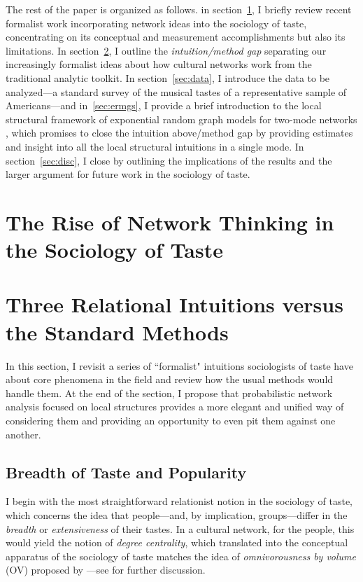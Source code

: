 \documentclass[preprint,12pt,authoryear]{elsarticle}
\begin{document}
The rest of the paper is organized as follows. in section~\ref{sec:networks}, I briefly review recent formalist work incorporating network ideas into the sociology of taste, concentrating on its conceptual and measurement accomplishments but also its limitations. In section~\ref{sec:localstruct}, I outline the \textit{intuition/method gap} separating our increasingly formalist ideas about how cultural networks work from the traditional analytic toolkit. In section~\ref{sec:data}, I introduce the data to be analyzed---a standard survey of the musical tastes of a representative sample of Americans---and in~\ref{sec:ermgs}, I provide a brief introduction to the local structural framework of exponential random graph models for two-mode networks \citep{pattison2002neighborhood}, which promises to close the intuition above/method gap by providing estimates and insight into all the local structural intuitions in a single mode. In section~\ref{sec:disc}, I close by outlining the implications of the results and the larger argument for future work in the sociology of taste. 

\section{The Rise of Network Thinking in the Sociology of Taste}
\label{sec:networks}

\section{Three Relational Intuitions versus the Standard Methods}
\label{sec:localstruct}

In this section, I revisit a series of ``formalist" intuitions sociologists of taste have about core phenomena in the field and review how the usual methods would handle them. At the end of the section, I propose that probabilistic network analysis focused on local structures provides a more elegant and unified way of considering them and providing an opportunity to even pit them against one another. 

\subsection{Breadth of Taste and Popularity}
I begin with the most straightforward relationist notion in the sociology of taste, which concerns the idea that people---and, by implication, groups---differ in the \textit{breadth} or \textit{extensiveness} of their tastes. In a cultural network, for the people, this would yield the notion of \textit{degree centrality}, which translated into the conceptual apparatus of the sociology of taste matches the idea of \textit{omnivorousness by volume} (OV) proposed by \citet{warde2009anatomy}---see \citet{lizardo2014omnivorousness} for further discussion. 
\end{document}
